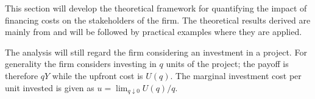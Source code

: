 \documentclass[../main.tex]{subfiles}
\begin{document}
    This section will develop the theoretical framework for quantifying the impact of financing costs on the stakeholders of the firm.
    The theoretical results derived are mainly from \cite{ADS2019} and will be followed by practical examples where they are applied.


    The analysis will still regard the firm considering an investment in a project.
    For generality the firm considers investing in $q$ units of the project; 
    the payoff is therefore $qY$ while the upfront cost is $U(q)$. 
    The marginal investment cost per unit invested is given as 
    $u = \lim_{q\downarrow 0} U(q) / q$.
\end{document}
